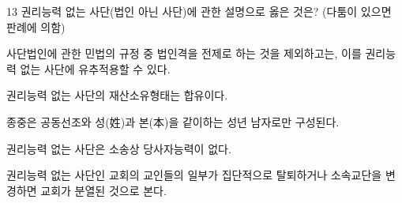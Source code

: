 \begin{question}{13}
권리능력 없는 사단(법인 아닌 사단)에 관한 설명으로 옳은 것은? (다툼이 있으면 판례에 의함)
\begin{choices}
  \item 사단법인에 관한 민법의 규정 중 법인격을 전제로 하는 것을 제외하고는, 이를 권리능력 없는 사단에 유추적용할 수 있다.
  \item 권리능력 없는 사단의 재산소유형태는 합유이다.
  \item 종중은 공동선조와 성(姓)과 본(本)을 같이하는 성년 남자로만 구성된다.
  \item 권리능력 없는 사단은 소송상 당사자능력이 없다.
  \item 권리능력 없는 사단인 교회의 교인들의 일부가 집단적으로 탈퇴하거나 소속교단을 변경하면 교회가 분열된 것으로 본다.
\end{choices}
\end{question}
